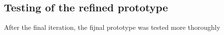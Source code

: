 \subsection{Testing of the refined prototype}
After the final iteration, the fijnal prototype was tested more thoroughly
